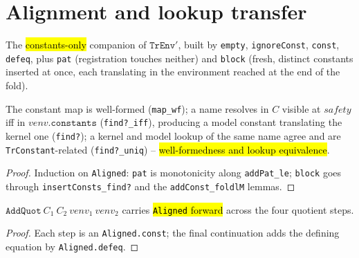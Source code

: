 \section{Alignment and lookup transfer}

\begin{definition}
\label{ind:aligned}
\leanok
{}

 The \hl{constants-only} companion of $\mathtt{TrEnv}'$, built by
\texttt{empty}, \texttt{ignoreConst}, \texttt{const}, \texttt{defeq}, plus \texttt{pat}
(registration touches neither) and \texttt{block} (fresh, distinct constants inserted at
once, each translating in the environment reached at the end of the fold).
\end{definition}

\begin{lemma}
\label{family:aligned-basic}
\leanok
{}

 The constant map is well-formed (\texttt{map\_wf}); a name resolves in $C$
visible at $safety$ iff in $venv.\mathtt{constants}$ (\texttt{find?\_iff}), producing a
model constant translating the kernel one (\texttt{find?}); a kernel and model lookup of
the same name agree and are \texttt{TrConstant}-related (\texttt{find?\_uniq}) --
\hl{well-formedness and lookup equivalence}.
\end{lemma}
\begin{proof}
\leanok
{} Induction on \texttt{Aligned}: \texttt{pat} is monotonicity along
\texttt{addPat\_le}; \texttt{block} goes through \texttt{insertConsts\_find?} and the
\texttt{addConst\_foldlM} lemmas.
\end{proof}

\begin{lemma}
\label{family:aligned-quot}
\leanok
{}

 $\mathtt{AddQuot}\ C_1\ C_2\ venv_1\ venv_2$ carries \hl{\texttt{Aligned}
forward} across the four quotient steps.
\end{lemma}
\begin{proof}
\leanok
{} Each step is an \texttt{Aligned.const}; the final continuation adds the
defining equation by \texttt{Aligned.defeq}.
\end{proof}

